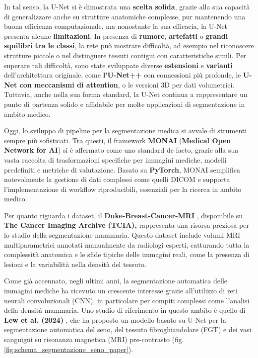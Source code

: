 In tal senso, la U-Net si è dimostrata una \textbf{scelta solida}, grazie alla sua capacità di generalizzare anche su strutture anatomiche complesse, pur mantenendo una buona efficienza computazionale, ma nonostante la sua efficacia, la U-Net presenta alcune \textbf{limitazioni}. In presenza di \textbf{rumore}, \textbf{artefatti} o \textbf{grandi squilibri tra le classi}, la rete può mostrare difficoltà, ad esempio nel riconoscere strutture piccole o nel distinguere tessuti contigui con caratteristiche simili. Per superare tali difficoltà, sono state sviluppate diverse \textbf{estensioni} e \textbf{varianti} dell’architettura originale, come \textbf{l’U-Net++} con connessioni più profonde, le \textbf{U-Net con meccanismi di attention}, o le versioni 3D per dati volumetrici. Tuttavia, anche nella sua forma standard, la U-Net continua a rappresentare un punto di partenza solido e affidabile per molte applicazioni di segmentazione in ambito medico.




Oggi, lo sviluppo di pipeline per la segmentazione medica si avvale di strumenti sempre più sofisticati. Tra questi, il framework \textbf{MONAI} (\textbf{Medical Open Network for AI}) si è affermato come uno standard de facto, grazie alla sua vasta raccolta di trasformazioni specifiche per immagini mediche, modelli predefiniti e metriche di valutazione. Basato su \textbf{PyTorch}, MONAI semplifica notevolmente la gestione di dati complessi come quelli DICOM e supporta l’implementazione di workflow riproducibili, essenziali per la ricerca in ambito medico.

Per quanto riguarda i dataset, il \textbf{Duke-Breast-Cancer-MRI} \cite{duke_breast_mri}, disponibile su \textbf{The Cancer Imaging Archive (TCIA),} rappresenta una risorsa preziosa per lo studio della segmentazione mammaria. Questo dataset include volumi MRI multiparametrici annotati manualmente da radiologi esperti, catturando tutta la complessità anatomica e le sfide tipiche delle immagini reali, come la presenza di lesioni e la variabilità nella densità del tessuto.


Come già accennato, negli ultimi anni, la segmentazione automatica delle immagini mediche ha ricevuto un crescente interesse grazie all’utilizzo di reti neurali convoluzionali (CNN), in particolare per compiti complessi come l’analisi della densità mammaria. Uno studio di riferimento in questo ambito è quello di \textbf{Lew et al. (2024)} \cite{lew2024segmentation}, che ha proposto un modello basato su U-Net per la segmentazione automatica del seno, del tessuto fibroghiandolare (FGT) e dei vasi sanguigni su risonanza magnetica (MRI) pre-contrasto (fig. \ref{fig:schema_segmentazione_seno_paper}).

